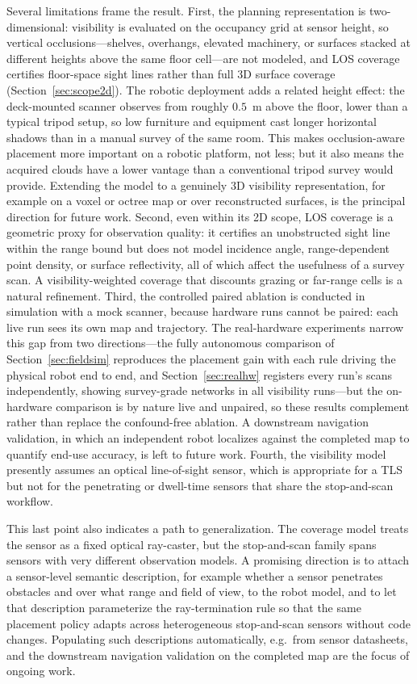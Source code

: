 \documentclass[sensors,article,submit,pdftex,moreauthors]{Definitions/mdpi}
\begin{document}
Several limitations frame the result. First, the planning representation is
two-dimensional: visibility is evaluated on the occupancy grid at sensor
height, so vertical occlusions---shelves, overhangs, elevated machinery, or
surfaces stacked at different heights above the same floor cell---are not
modeled, and LOS coverage certifies floor-space sight lines rather than full
3D surface coverage (Section~\ref{sec:scope2d}). The robotic deployment adds
a related height effect: the deck-mounted scanner observes from roughly
$0.5$~m above the floor, lower than a typical tripod setup, so low furniture
and equipment cast longer horizontal shadows than in a manual survey of the
same room. This makes occlusion-aware placement more important on a robotic
platform, not less; but it also means the acquired clouds have a lower vantage
than a conventional tripod survey would provide. Extending the model to a
genuinely 3D visibility representation, for example on a voxel or octree map
or over reconstructed surfaces, is the principal direction for future work.
Second, even within its 2D scope, LOS coverage is a geometric proxy
for observation quality: it certifies an unobstructed sight line within the range
bound but does not model incidence angle, range-dependent point density, or
surface reflectivity, all of which affect the usefulness of a survey scan. A
visibility-weighted coverage that discounts grazing or far-range cells is a
natural refinement. Third, the controlled paired ablation is conducted in
simulation with a mock scanner, because hardware runs cannot be paired: each
live run sees its own map and trajectory. The real-hardware experiments narrow
this gap from two directions---the fully autonomous comparison of
Section~\ref{sec:fieldsim} reproduces the placement gain with each rule driving
the physical robot end to end, and Section~\ref{sec:realhw} registers every
run's scans independently, showing survey-grade networks in all visibility
runs---but the on-hardware comparison is by nature live and unpaired, so these
results complement rather than replace the confound-free ablation. A downstream
navigation validation, in which an independent robot localizes against the
completed map to quantify end-use accuracy, is left to future work.
Fourth, the visibility model presently assumes an optical line-of-sight sensor,
which is
appropriate for a TLS but not for the penetrating or dwell-time sensors that
share the stop-and-scan workflow.

This last point also indicates a path to generalization. The coverage model
treats the sensor as a fixed optical ray-caster, but the stop-and-scan family
spans sensors with very different observation models. A promising direction is to
attach a sensor-level semantic description, for example whether a sensor
penetrates obstacles and over what range and field of view, to the robot model,
and to let that description parameterize the ray-termination rule so that the same
placement policy adapts across heterogeneous stop-and-scan sensors without code
changes. Populating such descriptions automatically, e.g.\ from sensor
datasheets, and the downstream navigation validation on the completed map are
the focus of ongoing work.
\end{document}
